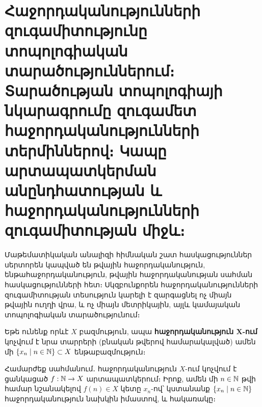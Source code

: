 \documentclass[./main.tex]{subfiles}
\begin{document}
\onehalfspacing
\section{Հաջորդականությունների զուգամիտությունը տոպոլոգիական տարածություններում։ Տարածության տոպոլոգիայի նկարագրումը զուգամետ հաջորդա\-կանությունների տերմիններով։ Կապը արտապատկերման անընդհատության և հաջորդականությունների զուգամիտության միջև։}\label{sec:10}


\par Մաթեմատիկական անալիզի հիմնական շատ հասկացություններ սերտորեն \linebreak կապ\-ված են թվային հաջորդականություն, ենթահաջորդականություն, թվային հա\-ջոր\-դա\-կա\-նու\-թյան սահման հասկացությունների հետ։ Սկզբունքորեն հա\-ջոր\-դա\-կա\-նու\-թյունների զուգամիտության տեսություն կարելի է զարգացնել ոչ միայն թվա\-յին ուղղի վրա, և ոչ միայն մետրիկային, այլև կամայական տոպոլոգիական տարա\-ծու\-թյու\-նում։



\par Եթե ունենք որևէ $X$ բազմություն, ապա \textbf{հաջորդականություն $\boldsymbol{X}$-ում} կոչվում է նրա տարրերի (բնական թվերով համարակալված) ամեն մի $\{x_n \mid n \in \mathbb{N} \} \subset X$ ենթաբազ\-մու\-թյուն։

\par Համարժեք սահմանում․ հաջորդականություն $X$-ում կոչվում է ցանկացած \linebreak ${f:\mathbb{N}\rightarrow X}$ արտապատկերում։ Իրոք, ամեն մի ${n \in \mathbb{N}}$ թվի համար նշանակելով \linebreak ${f(n)\in X}$ կետը $x_n$-ով՝ կստանանք $\{x_n \mid n \in \mathbb{N}\}$ հաջորդականություն նախկին իմաստով, և հակառակը։
\end{document}
